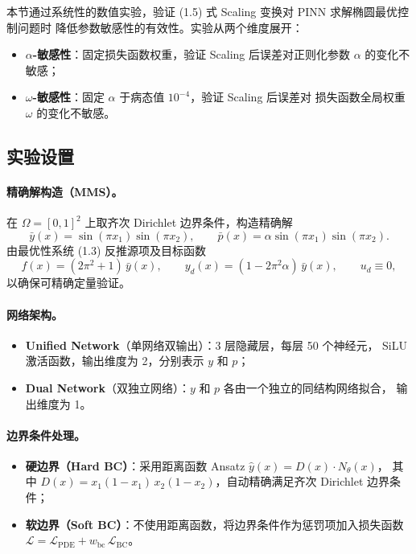 \documentclass[UTF8, 12pt]{ctexart}
\begin{document}
本节通过系统性的数值实验，验证 (1.5) 式 Scaling 变换对 PINN 求解椭圆最优控制问题时
降低参数敏感性的有效性。实验从两个维度展开：
\begin{itemize}
  \item \textbf{$\alpha$-敏感性}：固定损失函数权重，验证 Scaling 后误差对正则化参数
        $\alpha$ 的变化不敏感；
  \item \textbf{$\omega$-敏感性}：固定 $\alpha$ 于病态值 $10^{-4}$，验证 Scaling 后误差对
        损失函数全局权重 $\omega$ 的变化不敏感。
\end{itemize}


\subsection{实验设置}
\label{subsec:exp-setup}

\paragraph{精确解构造（MMS）。}
在 $\Omega = [0,1]^2$ 上取齐次 Dirichlet 边界条件，构造精确解
\[
  \bar{y}(x) = \sin(\pi x_1)\sin(\pi x_2), \qquad
  \bar{p}(x) = \alpha\sin(\pi x_1)\sin(\pi x_2).
\]
由最优性系统 (1.3) 反推源项及目标函数
\[
  f(x) = (2\pi^2 + 1)\,\bar{y}(x), \qquad
  y_d(x) = (1 - 2\pi^2\alpha)\,\bar{y}(x), \qquad
  u_d \equiv 0,
\]
以确保可精确定量验证。

\paragraph{网络架构。}
\begin{itemize}
  \item \textbf{Unified Network}（单网络双输出）：3 层隐藏层，每层 50 个神经元，
        SiLU 激活函数，输出维度为 2，分别表示 $y$ 和 $p$；
  \item \textbf{Dual Network}（双独立网络）：$y$ 和 $p$ 各由一个独立的同结构网络拟合，
        输出维度为 1。
\end{itemize}

\paragraph{边界条件处理。}
\begin{itemize}
  \item \textbf{硬边界（Hard BC）}：采用距离函数 Ansatz
        $\hat{y}(x) = D(x)\cdot N_\theta(x)$，
        其中 $D(x) = x_1(1-x_1)\,x_2(1-x_2)$，自动精确满足齐次 Dirichlet 边界条件；
  \item \textbf{软边界（Soft BC）}：不使用距离函数，将边界条件作为惩罚项加入损失函数
        $\mathcal{L} = \mathcal{L}_{\mathrm{PDE}} + w_{\mathrm{bc}}\,\mathcal{L}_{\mathrm{BC}}$。
\end{itemize}
\end{document}
